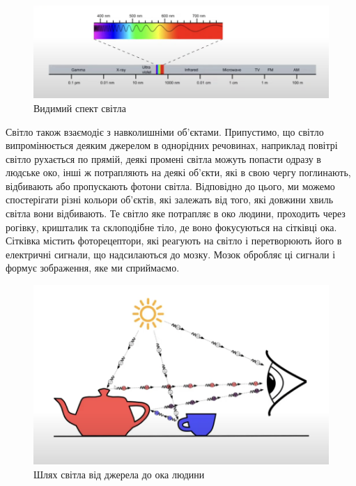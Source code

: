 \begin{figure}[h]
\centering
\includegraphics[scale=1]{Pictures/LightSpec.png}
\caption{Видимий спект світла}
\label{fig:LightSpectrum}
\end{figure}

  \par Світло також взаємодіє з навколишніми об'єктами. Припустимо, що світло випромінюється деяким джерелом в однорідних речовинах, наприклад повітрі
  світло рухається по прямій, деякі промені світла можуть попасти одразу в людське око, інші ж потрапляють на деякі об'єкти, які в свою чергу поглинають, відбивають або
  пропускають фотони світла. Відповідно до цього, ми можемо спостерігати різні кольори об'єктів, які залежать від того, які довжини хвиль світла вони відбивають.
  Те світло яке потрапляє в око людини, проходить через рогівку, кришталик та склоподібне тіло, де воно фокусуються на сітківці ока. Сітківка містить фоторецептори, 
  які реагують на світло і перетворюють його в електричні сигнали, що надсилаються до мозку. Мозок обробляє ці сигнали і формує зображення, яке ми сприймаємо.

 \begin{figure}[h]
  \centering
  \includegraphics[scale=1]{Pictures/LightPath.png}
  \caption{Шлях світла від джерела до ока людини}
  \label{fig:LightPath}
\end{figure}

